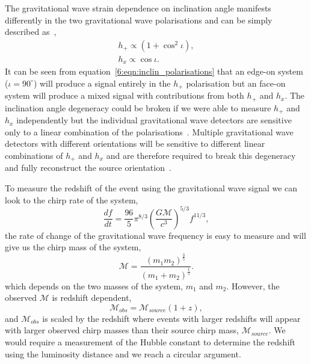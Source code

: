 The gravitational wave strain dependence on inclination angle manifests differently in the two gravitational wave polarisations and can be simply described as~\cite{inclin_degen:2018},
%
\begin{eqnarray}
    h_{+} \propto \left(1+\cos^{2}\iota\right), \\
    h_{x} \propto \cos\iota .
    \label{6:eqn:inclin_polarisations}
\end{eqnarray}
%
It can be seen from equation~\ref{6:eqn:inclin_polarisations} that an edge-on system ($\iota = 90^{\circ}$) will produce a signal entirely in the $h_{+}$ polarisation but an face-on system will produce a mixed signal with contributions from both $h_{+}$ and $h_{x}$. The inclination angle degeneracy could be broken if we were able to measure $h_{+}$ and $h_{x}$ independently but the individual gravitational wave detectors are sensitive only to a linear combination of the polarisations~\cite{aLIGO:2015}. Multiple gravitational wave detectors with different orientations will be sensitive to different linear combinations of $h_{+}$ and $h_{x}$ and are therefore required to break this degeneracy and fully reconstruct the source orientation~\cite{inclin_degen_2:2019}.

To measure the redshift of the event using the gravitational wave signal we can look to the chirp rate of the system,
%
\begin{equation}
    \frac{df}{dt} = \frac{96}{5} \pi^{8/3} \left(\frac{G\mathcal{M}}{c^{3}}\right)^{5/3} f^{11/3},
    \label{6:eq:chirp_rate}
\end{equation}
%
the rate of change of the gravitational wave frequency is easy to measure and will give us the chirp mass of the system,
%
\begin{equation}
    \mathcal{M} = \frac{(m_1 m_2)^{\frac{3}{5}}}{(m_1 + m_2)^{\frac{1}{5}}}.
    \label{6:eq:mchirp}
\end{equation}
%
which depends on the two masses of the system, $m_{1}$ and $m_{2}$. However, the observed $\mathcal{M}$ is redshift dependent,
%
\begin{equation}
    \mathcal{M}_{obs} = \mathcal{M}_{source}(1 + z), 
    \label{6:eq:mchirp_obs}
\end{equation}
and $\mathcal{M}_{obs}$ is scaled by the redshift where events with larger redshifts will appear with larger observed chirp masses than their source chirp mass, $\mathcal{M}_{source}$. We would require a measurement of the Hubble constant to determine the redshift using the luminosity distance and we reach a circular argument.

